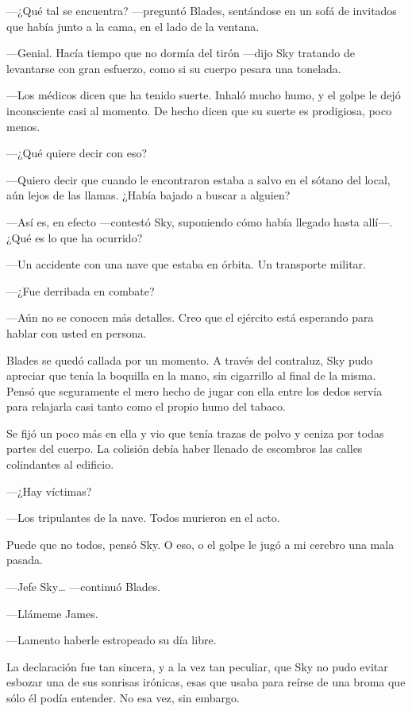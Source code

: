 ---¿Qué tal se encuentra? ---preguntó Blades, sentándose en un sofá de invitados que había junto a la cama, en el lado de la ventana.

---Genial. Hacía tiempo que no dormía del tirón ---dijo Sky tratando de levantarse con gran esfuerzo, como si su cuerpo pesara una tonelada.

---Los médicos dicen que ha tenido suerte. Inhaló mucho humo, y el golpe le dejó inconsciente casi al momento. De hecho dicen que su suerte es prodigiosa, poco menos.

---¿Qué quiere decir con eso?

---Quiero decir que cuando le encontraron estaba a salvo en el sótano del local, aún lejos de las llamas. ¿Había bajado a buscar a alguien?

---Así es, en efecto ---contestó Sky, suponiendo cómo había llegado hasta allí---. ¿Qué es lo que ha ocurrido?

---Un accidente con una nave que estaba en órbita. Un transporte militar.

---¿Fue derribada en combate?

---Aún no se conocen más detalles. Creo que el ejército está esperando para hablar con usted en persona.

Blades se quedó callada por un momento. A través del contraluz, Sky pudo apreciar que tenía la boquilla en la mano, sin cigarrillo al final de la misma. Pensó que seguramente el mero hecho de jugar con ella entre los dedos servía para relajarla casi tanto como el propio humo del tabaco.

Se fijó un poco más en ella y vio que tenía trazas de polvo y ceniza por todas partes del cuerpo. La colisión debía haber llenado de escombros las calles colindantes al edificio.

---¿Hay víctimas?

---Los tripulantes de la nave. Todos murieron en el acto.

Puede que no todos, pensó Sky. O eso, o el golpe le jugó a mi cerebro una mala pasada.

---Jefe Sky\dots{} ---continuó Blades.

---Llámeme James.

---Lamento haberle estropeado su día libre.

La declaración fue tan sincera, y a la vez tan peculiar, que Sky no pudo evitar esbozar una de sus sonrisas irónicas, esas que usaba para reírse de una broma que sólo él podía entender. No esa vez, sin embargo.

